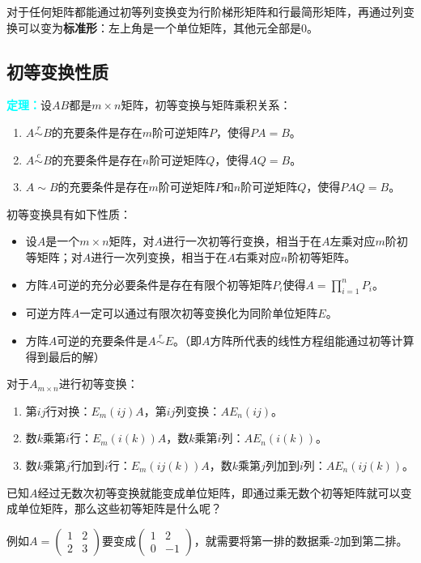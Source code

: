 \documentclass[UTF8, 12pt]{ctexart}
\begin{document}
对于任何矩阵都能通过初等列变换变为行阶梯形矩阵和行最简形矩阵，再通过列变换可以变为\textbf{标准形}：左上角是一个单位矩阵，其他元全部是0。

\subsection{初等变换性质}

\textcolor{aqua}{\textbf{定理：}}设$AB$都是$m\times n$矩阵，初等变换与矩阵乘积关系：\begin{enumerate}
    \item $A\overset{r}{\sim}B$的充要条件是存在$m$阶可逆矩阵$P$，使得$PA=B$。
    \item $A\overset{c}{\sim}B$的充要条件是存在$n$阶可逆矩阵$Q$，使得$AQ=B$。
    \item $A\sim B$的充要条件是存在$m$阶可逆矩阵$P$和$n$阶可逆矩阵$Q$，使得$PAQ=B$。
\end{enumerate}

初等变换具有如下性质：

\begin{itemize}
    \item 设$A$是一个$m\times n$矩阵，对$A$进行一次初等行变换，相当于在$A$左乘对应$m$阶初等矩阵；对$A$进行一次列变换，相当于在$A$右乘对应$n$阶初等矩阵。
    \item 方阵$A$可逆的充分必要条件是存在有限个初等矩阵$P_i$使得$A=\prod\limits_{i=1}^nP_i$。
    \item 可逆方阵$A$一定可以通过有限次初等变换化为同阶单位矩阵$E$。
    \item 方阵$A$可逆的充要条件是$A\overset{r}{\sim}E$。（即$A$方阵所代表的线性方程组能通过初等计算得到最后的解）
\end{itemize}

对于$A_{m\times n}$进行初等变换：\begin{enumerate}
    \item 第$ij$行对换：$E_m(ij)A$，第$ij$列变换：$AE_n(ij)$。
    \item 数$k$乘第$i$行：$E_m(i(k))A$，数$k$乘第$i$列：$AE_n(i(k))$。
    \item 数$k$乘第$j$行加到$i$行：$E_m(ij(k))A$，数$k$乘第$j$列加到$i$列：$AE_n(ij(k))$。
\end{enumerate}

已知$A$经过无数次初等变换就能变成单位矩阵，即通过乘无数个初等矩阵就可以变成单位矩阵，那么这些初等矩阵是什么呢？\medskip

例如$A=\left(\begin{array}{cc}
    1 & 2 \\
    2 & 3
\end{array}\right)$要变成$\left(\begin{array}{cc}
    1 & 2 \\
    0 & -1
\end{array}\right)$，就需要将第一排的数据乘-2加到第二排。
\end{document}
